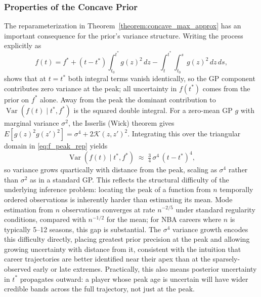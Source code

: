 \subsubsection{Properties of the Concave Prior}
The reparameterization in Theorem~\ref{theorem:concave_max_approx} has an important consequence for the prior's variance structure.  Writing the process explicitly as
\begin{equation}
  f(t) = f^* + (t - t^*)\!\int_{t_0}^{t^*} g(z)^2\,dz
         - \int_{t}^{t^*}\!\int_{t_0}^{s} g(z)^2\,dz\,ds,
  \label{eq:f_peak_rep}
\end{equation}
shows that at $t = t^*$ both integral terms vanish identically, so the GP component contributes zero variance at the peak; all uncertainty in $f(t^*)$ comes from the prior on $f^*$ alone.  Away from the peak the dominant contribution to $\operatorname{Var}(f(t) \mid t^*, f^*)$ is the squared double integral.  For a zero-mean GP $g$ with marginal variance $\sigma^2$, the Isserlis (Wick) theorem gives $E[g(z)^2 g(z')^2] = \sigma^4 + 2\mathcal{K}(z,z')^2$.  Integrating this over the triangular domain in \eqref{eq:f_peak_rep} yields
\begin{equation}
  \operatorname{Var}(f(t) \mid t^*, f^*) \;\approx\; \tfrac{3}{4}\,\sigma^4\,(t - t^*)^4,
  \label{eq:var_quartic}
\end{equation}
so variance grows quartically with distance from the peak, scaling as $\sigma^4$ rather than $\sigma^2$ as in a standard GP.  This reflects the structural difficulty of the underlying inference problem: locating the peak of a function from $n$ temporally ordered observations is inherently harder than estimating its mean.  Mode estimation from $n$ observations converges at rate $n^{-2/5}$ under standard regularity conditions, compared with $n^{-1/2}$ for the mean; for NBA careers where $n$ is typically 5--12 seasons, this gap is substantial.  The $\sigma^4$ variance growth encodes this difficulty directly, placing greatest prior precision at the peak and allowing growing uncertainty with distance from it, consistent with the intuition that career trajectories are better identified near their apex than at the sparsely-observed early or late extremes.  Practically, this also means posterior uncertainty in $t^*$ propagates outward: a player whose peak age is uncertain will have wider credible bands across the full trajectory, not just at the peak.



